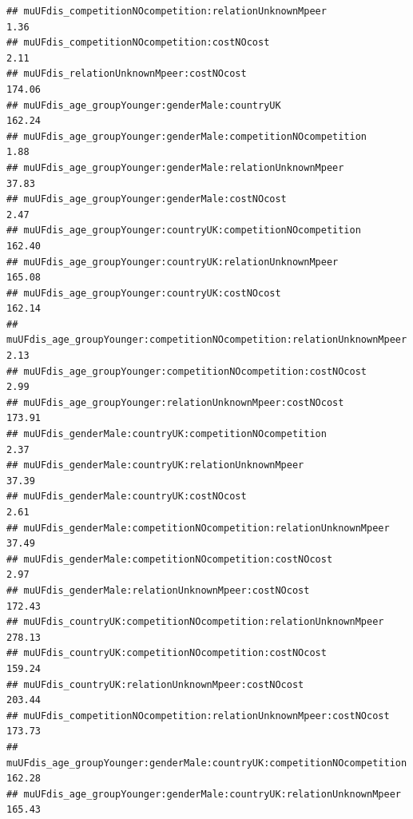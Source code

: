 \documentclass[
]{article}
\begin{document}
\begin{verbatim}
## muUFdis_competitionNOcompetition:relationUnknownMpeer                                             1.36
## muUFdis_competitionNOcompetition:costNOcost                                                       2.11
## muUFdis_relationUnknownMpeer:costNOcost                                                         174.06
## muUFdis_age_groupYounger:genderMale:countryUK                                                   162.24
## muUFdis_age_groupYounger:genderMale:competitionNOcompetition                                      1.88
## muUFdis_age_groupYounger:genderMale:relationUnknownMpeer                                         37.83
## muUFdis_age_groupYounger:genderMale:costNOcost                                                    2.47
## muUFdis_age_groupYounger:countryUK:competitionNOcompetition                                     162.40
## muUFdis_age_groupYounger:countryUK:relationUnknownMpeer                                         165.08
## muUFdis_age_groupYounger:countryUK:costNOcost                                                   162.14
## muUFdis_age_groupYounger:competitionNOcompetition:relationUnknownMpeer                            2.13
## muUFdis_age_groupYounger:competitionNOcompetition:costNOcost                                      2.99
## muUFdis_age_groupYounger:relationUnknownMpeer:costNOcost                                        173.91
## muUFdis_genderMale:countryUK:competitionNOcompetition                                             2.37
## muUFdis_genderMale:countryUK:relationUnknownMpeer                                                37.39
## muUFdis_genderMale:countryUK:costNOcost                                                           2.61
## muUFdis_genderMale:competitionNOcompetition:relationUnknownMpeer                                 37.49
## muUFdis_genderMale:competitionNOcompetition:costNOcost                                            2.97
## muUFdis_genderMale:relationUnknownMpeer:costNOcost                                              172.43
## muUFdis_countryUK:competitionNOcompetition:relationUnknownMpeer                                 278.13
## muUFdis_countryUK:competitionNOcompetition:costNOcost                                           159.24
## muUFdis_countryUK:relationUnknownMpeer:costNOcost                                               203.44
## muUFdis_competitionNOcompetition:relationUnknownMpeer:costNOcost                                173.73
## muUFdis_age_groupYounger:genderMale:countryUK:competitionNOcompetition                          162.28
## muUFdis_age_groupYounger:genderMale:countryUK:relationUnknownMpeer                              165.43

\end{verbatim}
\end{document}
